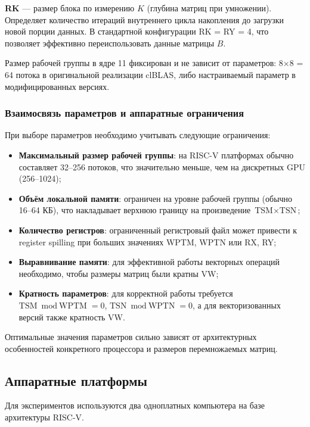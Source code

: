 \textbf{RK} --- размер блока по измерению $K$ (глубина матриц при умножении). Определяет количество итераций внутреннего цикла накопления до загрузки новой порции данных. В стандартной конфигурации RK = RY = 4, что позволяет эффективно переиспользовать данные матрицы $B$.

Размер рабочей группы в ядре 11 фиксирован и не зависит от параметров: 8×8 = 64 потока в оригинальной реализации clBLAS, либо настраиваемый параметр в модифицированных версиях.

\subsubsection{Взаимосвязь параметров и аппаратные ограничения}

При выборе параметров необходимо учитывать следующие ограничения:

\begin{itemize}
    \item \textbf{Максимальный размер рабочей группы}: на RISC-V платформах обычно составляет 32--256 потоков, что значительно меньше, чем на дискретных GPU (256--1024);
    \item \textbf{Объём локальной памяти}: ограничен на уровне рабочей группы (обычно 16--64 КБ), что накладывает верхнюю границу на произведение $\text{TSM} \times \text{TSN}$;
    \item \textbf{Количество регистров}: ограниченный регистровый файл может привести к register spilling при больших значениях WPTM, WPTN или RX, RY;
    \item \textbf{Выравнивание памяти}: для эффективной работы векторных операций необходимо, чтобы размеры матриц были кратны VW;
    \item \textbf{Кратность параметров}: для корректной работы требуется $\text{TSM} \bmod \text{WPTM} = 0$, $\text{TSN} \bmod \text{WPTN} = 0$, а для векторизованных версий также кратность VW.
\end{itemize}

Оптимальные значения параметров сильно зависят от архитектурных особенностей конкретного процессора и размеров перемножаемых матриц.

\subsection{Аппаратные платформы}

Для экспериментов используются два одноплатных компьютера на базе архитектуры RISC-V.

